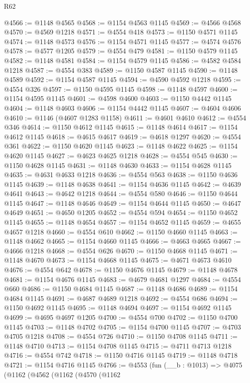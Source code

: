\begin{lexlean}{R62}
\begin{coremodule}
@4566 := @1148 @4565
@4568 := @1154 @4563 @1145
@4569 := @4566 @4568
@4570 := @4569 @1218
@4571 := @4554 @418
@4573 := @1150 @4571 @1145
@4574 := @1148 @4573
@4576 := @1154 @4571 @1145
@4577 := @4574 @4576
@4578 := @4577 @1205
@4579 := @4554 @479
@4581 := @1150 @4579 @1145
@4582 := @1148 @4581
@4584 := @1154 @4579 @1145
@4586 := @4582 @4584 @1218
@4587 := @4554 @383
@4589 := @1150 @4587 @1145
@4590 := @1148 @4589
@4592 := @1154 @4587 @1145
@4594 := @4590 @4592 @1218
@4595 := @4554 @326
@4597 := @1150 @4595 @1145
@4598 := @1148 @4597
@4600 := @1154 @4595 @1145
@4601 := @4598 @4600
@4603 := @1150 @4442 @1145
@4604 := @1148 @4603
@4606 := @1154 @4442 @1145
@4607 := @4604 @4606
@4610 := @1146 (@4607 @1283 @1158)
@4611 := @4601 @4610
@4612 := @4554 @346
@4614 := @1150 @4612 @1145
@4615 := @1148 @4614
@4617 := @1154 @4612 @1145
@4618 := @4615 @4617
@4619 := @4618 @1297
@4620 := @4554 @361
@4622 := @1150 @4620 @1145
@4623 := @1148 @4622
@4625 := @1154 @4620 @1145
@4627 := @4623 @4625 @1218
@4628 := @4554 @545
@4630 := @1150 @4628 @1145
@4631 := @1148 @4630
@4633 := @1154 @4628 @1145
@4635 := @4631 @4633 @1218
@4636 := @4554 @563
@4638 := @1150 @4636 @1145
@4639 := @1148 @4638
@4641 := @1154 @4636 @1145
@4642 := @4639 @4641
@4643 := @4642 @1218
@4644 := @4554 @580
@4646 := @1150 @4644 @1145
@4647 := @1148 @4646
@4649 := @1154 @4644 @1145
@4650 := @4647 @4649
@4651 := @4650 @1205
@4652 := @4554 @594
@4654 := @1150 @4652 @1145
@4655 := @1148 @4654
@4657 := @1154 @4652 @1145
@4659 := @4655 @4657 @1218
@4660 := @4554 @610
@4662 := @1150 @4660 @1145
@4663 := @1148 @4662
@4665 := @1154 @4660 @1145
@4666 := @4663 @4665
@4667 := @4666 @1218
@4668 := @4554 @626
@4670 := @1150 @4668 @1145
@4671 := @1148 @4670
@4673 := @1154 @4668 @1145
@4675 := @4671 @4673 @4610
@4676 := @4554 @642
@4678 := @1150 @4676 @1145
@4679 := @1148 @4678
@4681 := @1154 @4676 @1145
@4683 := @4679 @4681 @1297
@4684 := @4554 @660
@4686 := @1150 @4684 @1145
@4687 := @1148 @4686
@4689 := @1154 @4684 @1145
@4691 := @4687 @4689 @1218
@4692 := @4554 @686
@4694 := @1150 @4692 @1145
@4695 := @1148 @4694
@4697 := @1154 @4692 @1145
@4699 := @4695 @4697 @1205
@4700 := @4554 @700
@4702 := @1150 @4700 @1145
@4703 := @1148 @4702
@4705 := @1154 @4700 @1145
@4707 := @4703 @4705 @1218
@4708 := @4554 @726
@4710 := @1150 @4708 @1145
@4711 := @1148 @4710
@4713 := @1154 @4708 @1145
@4715 := @4711 @4713 @1218
@4716 := @4554 @742
@4718 := @1150 @4716 @1145
@4719 := @1148 @4718
@4721 := @1154 @4716 @1145
@4766 := @4553
    (fun (__b : @1013) =>
    @4075
      (@1162
        (@4562
          (@1162
            (@4570
              (@1162

\end{coremodule}
\end{lexlean}
